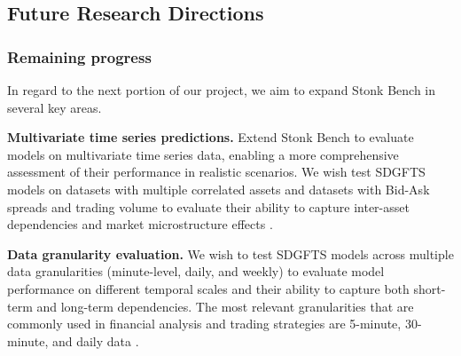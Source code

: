   \subsection{Future Research Directions}
    \subsubsection{Remaining progress} In regard to the next portion
    of our project, we aim to expand Stonk Bench in several key areas.
    \begin{enumerate}[label=\textbf{[F\arabic*]}]
      \item \textbf{Multivariate time series predictions.}
        Extend Stonk Bench to evaluate models on multivariate time
        series data, enabling a more comprehensive assessment of their
        performance in realistic scenarios. We wish test SDGFTS models
        on datasets with multiple correlated assets and datasets with
        Bid-Ask spreads and trading volume to evaluate their ability to
        capture inter-asset dependencies and market microstructure
        effects \cite{Takahashi24}.
        \item \textbf{Data granularity evaluation.}
        We wish to test SDGFTS models across multiple data granularities
        (minute-level, daily, and weekly) to evaluate model performance
        on different temporal scales and their ability to capture both
        short-term and long-term dependencies. The most relevant granularities
        that are commonly used in financial analysis and trading strategies
        are 5-minute, 30-minute, and daily data \cite{Wang20, Cont01}.
    \end{enumerate}

